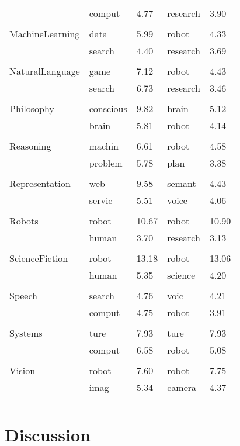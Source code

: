 \documentclass{article}
\begin{document}
\begin{center}
\begin{longtable}{lllll}
    & comput & 4.77 & research & 3.90\\
    &  &  &  & \\
    MachineLearning & data & 5.99 & robot & 4.33\\
    & search & 4.40 & research & 3.69\\
    &  &  &  & \\
    NaturalLanguage & game & 7.12 & robot & 4.43\\
    & search & 6.73 & research & 3.46 \\
    &  &  &  & \\
    Philosophy & conscious & 9.82 & brain & 5.12\\
    & brain & 5.81 & robot & 4.14\\
    &  &  &  & \\
    Reasoning & machin & 6.61 & robot & 4.58\\
    & problem & 5.78 & plan & 3.38\\
    &  &  &  & \\
    Representation & web & 9.58 & semant & 4.43\\
    & servic & 5.51 & voice & 4.06\\
    &  &  &  & \\
    Robots & robot & 10.67 & robot & 10.90\\
    & human & 3.70 & research & 3.13\\
    &  &  &  & \\
    ScienceFiction & robot & 13.18 & robot & 13.06\\
    & human & 5.35 & science & 4.20\\
    &  &  &  & \\
    Speech & search & 4.76 & voic & 4.21\\
    & comput & 4.75 & robot & 3.91\\
    &  &  &  & \\
    Systems & ture & 7.93 & ture & 7.93\\
    & comput & 6.58 & robot & 5.08\\
    &  &  &  & \\
    Vision & robot & 7.60 & robot & 7.75\\
    & imag & 5.34 & camera & 4.37\\
    & & & &

  \end{longtable}
\end{center}



\section{Discussion}
\end{document}
